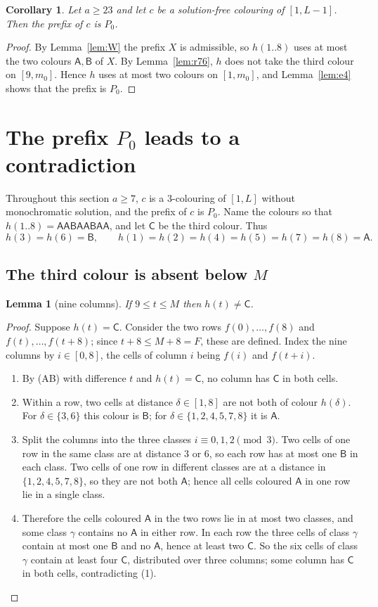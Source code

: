 \documentclass[11pt]{amsart}
\newtheorem{lemma}[theorem]{Lemma}
\newtheorem{corollary}[theorem]{Corollary}
\theoremstyle{definition}
\theoremstyle{remark}
\newcommand{\cA}{\mathsf{A}}\newcommand{\cB}{\mathsf{B}}\newcommand{\cC}{\mathsf{C}}
\newcommand{\Pz}{P_0}
\begin{document}
\begin{corollary}\label{cor:p0}
Let $a\ge23$ and let $c$ be a solution-free colouring of $[1,L-1]$. Then the prefix of $c$ is $\Pz$.
\end{corollary}
\begin{proof}
By Lemma~\ref{lem:W} the prefix $X$ is admissible, so $h(1..8)$ uses at most the two colours $\cA,\cB$ of $X$. By
Lemma~\ref{lem:r76}, $h$ does not take the third colour on $[9,m_0]$. Hence $h$ uses at most two colours on
$[1,m_0]$, and Lemma~\ref{lem:e4} shows that the prefix is $\Pz$.
\end{proof}

\section{The prefix $\Pz$ leads to a contradiction}\label{sec:p0}

Throughout this section $a\ge7$, $c$ is a $3$-colouring of $[1,L]$ without monochromatic solution, and the prefix of
$c$ is $\Pz$. Name the colours so that $h(1..8)=\cA\cA\cB\cA\cA\cB\cA\cA$, and let $\cC$ be the third colour. Thus
\[h(3)=h(6)=\cB,\qquad h(1)=h(2)=h(4)=h(5)=h(7)=h(8)=\cA .\]

\subsection{The third colour is absent below $M$}
\begin{lemma}[nine columns]\label{lem:nine}
If $9\le t\le M$ then $h(t)\ne\cC$.
\end{lemma}
\begin{proof}
Suppose $h(t)=\cC$. Consider the two rows $f(0),\dots,f(8)$ and $f(t),\dots,f(t+8)$; since $t+8\le M+8=F$, these
are defined. Index the nine columns by $i\in[0,8]$, the cells of column $i$ being $f(i)$ and $f(t+i)$.
\begin{enumerate}
\item By (AB) with difference $t$ and $h(t)=\cC$, no column has $\cC$ in both cells.
\item Within a row, two cells at distance $\delta\in[1,8]$ are not both of colour $h(\delta)$. For $\delta\in\{3,6\}$
this colour is $\cB$; for $\delta\in\{1,2,4,5,7,8\}$ it is $\cA$.
\item Split the columns into the three classes $i\equiv0,1,2\pmod 3$. Two cells of one row in the same class are at
distance $3$ or $6$, so each row has at most one $\cB$ in each class. Two cells of one row in different classes are
at a distance in $\{1,2,4,5,7,8\}$, so they are not both $\cA$; hence all cells coloured $\cA$ in one row lie in a
single class.
\item Therefore the cells coloured $\cA$ in the two rows lie in at most two classes, and some class $\gamma$ contains
no $\cA$ in either row. In each row the three cells of class $\gamma$ contain at most one $\cB$ and no $\cA$, hence at
least two $\cC$. So the six cells of class $\gamma$ contain at least four $\cC$, distributed over three columns; some
column has $\cC$ in both cells, contradicting (1).\qedhere
\end{enumerate}
\end{proof}
\end{document}
